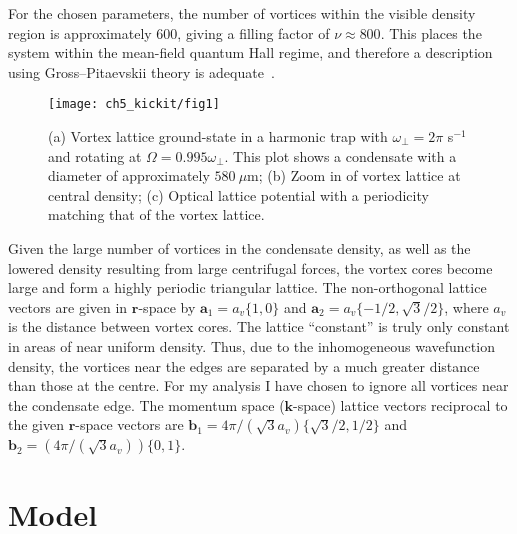 For the chosen parameters, the number of vortices within the visible density region is approximately 600, giving a filling factor of $\nu \approx 800 $. This places the system within the mean-field quantum Hall regime, and therefore a description using Gross--Pitaevskii theory is adequate~\cite{Vtx:Schweikhard_prl_2004}.

\begin{figure}[ht]
    \centering
    \texttt{[image: ch5\_kickit/fig1]}
    \caption[Comparison of vortex lattice and optical lattice structures.]{(a) Vortex lattice ground-state in a harmonic trap with $\omega_\perp=2\pi$ s$^{-1}$ and rotating at $\Omega=0.995\omega_\perp$. This plot shows a condensate with a diameter of approximately $580~\mu\textrm{m}$; (b) Zoom in of vortex lattice at central density; (c) Optical lattice potential with a periodicity matching that of the vortex lattice.}
    \label{fig:vlatt_gnd}
\end{figure}
\fi

Given the large number of vortices in the condensate density, as well as the lowered density resulting from large centrifugal forces, the vortex cores become large and form a highly periodic triangular lattice. The non-orthogonal lattice vectors are given in $\mathbf{r}$-space by $\mathbf{a}_1 = a_v\{1,0\}$ and $\mathbf{a}_2 = a_v\{-1/2, \sqrt{3}/2\}$, where $a_v$ is the distance between vortex cores. The lattice ``constant'' is truly only constant in areas of near uniform density. Thus, due to the inhomogeneous wavefunction density, the vortices near the edges are separated by a much greater distance than those at the centre. For my analysis I have chosen to ignore all vortices near the condensate edge. The momentum space ($\mathbf{k}$-space) lattice vectors reciprocal to the given $\mathbf{r}$-space vectors are $\mathbf{b}_1 = 4\pi/(\sqrt{3}a_v)\{\sqrt{3}/2,1/2\}$ and $\mathbf{b}_2 = (4\pi/(\sqrt{3}a_v))\{0,1\}$.


\section{Model}

